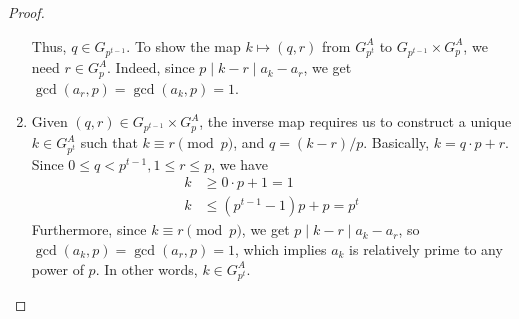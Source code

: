 \documentclass{article}
\theoremstyle{definition}
\begin{document}
\begin{proof}
\begin{enumerate}
	Thus, $q \in G_{p^{t - 1}}$. To show the map $k \mapsto (q, r)$ from $G^A_{p^t}$ to $G_{p^{t - 1}} \times G^A_p$, we need $r \in G^A_p$. Indeed, since $p \mid k - r \mid a_k - a_r$, we get $\gcd(a_r, p) = \gcd(a_k, p) = 1$. 
	\item Given $(q, r) \in G_{p^{t - 1}} \times G^A_p$, the inverse map requires us to construct a unique $k \in G^A_{p^t}$ such that $k \equiv r \pmod{p}$, and $q = (k - r)/p$. Basically, $k = q \cdot p + r$. Since $0 \leq q < p^{t - 1}, 1 \leq r \leq p$, we have
	\begin{align*}
	k & \geq 0 \cdot p + 1 = 1 \\
	k & \leq (p^{t - 1}-1) p + p = p^t
	\end{align*}
	Furthermore, since $k \equiv r \pmod{p}$, we get $p \mid k - r \mid a_k - a_r$, so $\gcd(a_k, p) = \gcd(a_r, p) = 1$, which implies $a_k$ is relatively prime to any power of $p$. In other words, $k \in G_{p^t}^A$.
\end{enumerate}
\end{proof}
\end{document}
